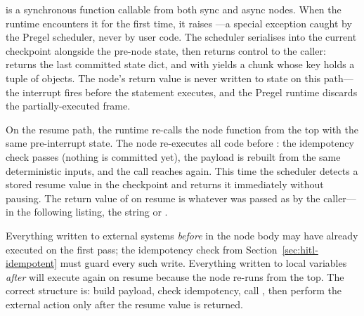  is a synchronous function callable from both sync
and async nodes. When the runtime encounters it for the first time, it
raises ---a special exception caught by the Pregel
scheduler, never by user code. The scheduler serialises  into
the current checkpoint alongside the pre-node state, then returns control
to the caller:  returns the last committed state
dict, and  with  yields
a chunk whose  key holds a tuple of 
objects. The node's return value is never written to state on this
path---the interrupt fires before the  statement executes, and
the Pregel runtime discards the partially-executed frame.

On the resume path, the runtime re-calls the node function from the top
with the same pre-interrupt state. The node re-executes all code before
: the idempotency check passes (nothing is committed
yet), the payload is rebuilt from the same deterministic inputs, and the
call reaches  again. This time the scheduler
detects a stored resume value in the checkpoint and returns it immediately
without pausing. The return value of  on resume is
whatever was passed as  by the caller---in the
following listing, the string  or .

\begin{warningbox}
Everything written to external systems \emph{before} 
in the node body may have already executed on the first pass; the
idempotency check from Section~\ref{sec:hitl-idempotent} must guard
every such write. Everything written to local variables \emph{after}
 will execute again on resume because the node
re-runs from the top. The correct structure is: build payload, check
idempotency, call , then perform the external action
only after the resume value is returned.
\end{warningbox}

